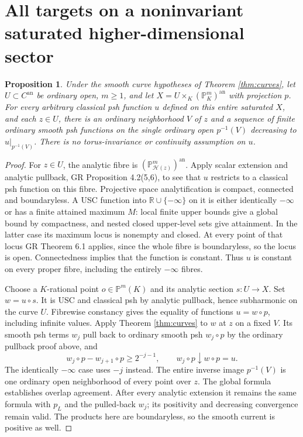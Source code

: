 \documentclass[11pt]{article}
\newtheorem{proposition}[theorem]{Proposition}
\theoremstyle{remark}
\newcommand{\an}{\mathrm{an}}
\begin{document}
\section{All targets on a noninvariant saturated higher-dimensional sector}
\begin{proposition}\label{prop:saturated}
Under the smooth curve hypotheses of Theorem \ref{thm:curves}, let
$U\subset C^\an$ be ordinary open, $m\geq1$, and let
$X=U\times_K(\mathbb P^m_K)^\an$ with projection $p$.
For every arbitrary classical psh function $u$ defined on this entire
saturated $X$, and each $z\in U$, there is an ordinary neighborhood
$V$ of $z$ and a sequence of finite ordinary smooth psh functions on
the single ordinary open $p^{-1}(V)$ decreasing to $u|_{p^{-1}(V)}$.
There is no torus-invariance or continuity assumption on $u$.
\end{proposition}
\begin{proof}
For $z\in U$, the analytic fibre is
$(\mathbb P^m_{\mathcal H(z)})^\an$. Apply scalar extension and analytic
pullback, GR Proposition 4.2(5,6), to see that $u$ restricts to a classical
psh function on this fibre. Projective space analytification is compact,
connected and boundaryless. A USC function into $\mathbb R\cup\{-\infty\}$
on it is either identically $-\infty$ or has a finite attained maximum $M$:
local finite upper bounds give a global bound by compactness, and nested
closed upper-level sets give attainment. In the latter case its maximum
locus is nonempty and closed. At every point of that locus GR Theorem 6.1
applies, since the whole fibre is boundaryless, so the locus is open.
Connectedness implies that the function is constant. Thus $u$ is constant
on every proper fibre, including the entirely $-\infty$ fibres.

Choose a $K$-rational point $o\in\mathbb P^m(K)$ and its analytic section
$s:U\to X$. Set $w=u\circ s$. It is USC and classical psh by analytic
pullback, hence subharmonic on the curve $U$. Fibrewise constancy gives
the equality of functions $u=w\circ p$, including infinite values.
Apply Theorem \ref{thm:curves} to $w$ at $z$ on a fixed $V$. Its smooth
psh terms $w_j$ pull back to ordinary smooth psh $w_j\circ p$ by the
ordinary pullback proof above, and
\[
 w_j\circ p-w_{j+1}\circ p\geq2^{-j-1},\qquad
 w_j\circ p\downarrow w\circ p=u.
\]
The identically $-\infty$ case uses $-j$ instead. The entire inverse
image $p^{-1}(V)$ is one ordinary open neighborhood of every point over
$z$. The global formula establishes overlap agreement. After every
analytic extension it remains the same formula with $p_L$ and the
pulled-back $w_j$; its positivity and decreasing convergence remain valid.
The products here are boundaryless, so the smooth current is positive as
well.
\end{proof}
\end{document}
